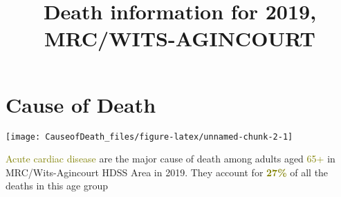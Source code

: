 \documentclass[
]{article}
\title{Death information for 2019, MRC/WITS-AGINCOURT}
\author{}
\date{\vspace{-2.5em}}
\newcommand{\btwocol}{\begin{multicols}{2}}
\newcommand{\etwocol}{\end{multicols}}
\begin{document}
\maketitle

\hypertarget{cause-of-death}{%
\section{Cause of Death}\label{cause-of-death}}

\btwocol

\texttt{[image: CauseofDeath\_files/figure-latex/unnamed-chunk-2-1]}

\begingroup
\fontsize{25}{25}\selectfont

\textcolor{olive}{Acute cardiac disease} are the major cause of death
among adults aged \textcolor{olive}{65+} in MRC/Wits-Agincourt HDSS Area
in 2019. They account for \begingroup
{}\fontsize{50}{50}\selectfont
\textbf{\textcolor{olive}{27\%}} \fontsize{25}{25}\selectfont \endgroup
of all the deaths in this age group \endgroup

\etwocol
\end{document}
